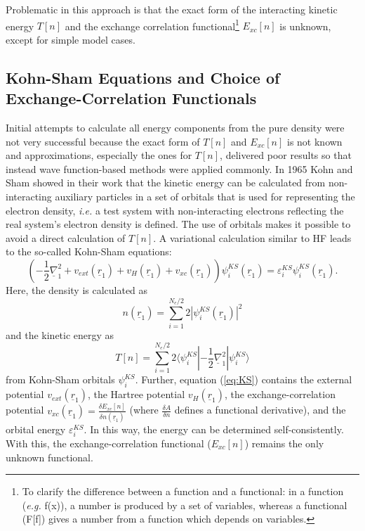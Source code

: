 \documentclass[11pt,DIV=13,BCOR=5mm,a4paper,headinclude]{scrbook}
\renewcommand{\vec}[1]{\underline{#1}}
\begin{document}
Problematic in this approach is that the exact form of the interacting kinetic energy $T[n]$ and the exchange correlation functional\footnote{To clarify the difference between a function and a functional: in a function (\textit{e.g.} f(x)), a number is produced by a set of variables, whereas a functional (F[f]) gives a number from a function which depends on variables.} $E_{xc}[n]$ is unknown, except for simple model cases.

\subsection{Kohn-Sham Equations and Choice of Exchange-Correlation Functionals}
Initial attempts to calculate all energy components from the pure density were not very successful because the exact form of $T[n]$ and $E_{xc}[n]$ is not known and approximations, especially the ones for $T[n]$, delivered poor results so that instead wave function-based methods were applied commonly.
In 1965 Kohn and Sham showed in their work\cite{Kohn-Sham1965} that the kinetic energy can be calculated from non-interacting auxiliary particles in a set of orbitals that is used for representing the electron density, \textit{i.e.} a test system with non-interacting electrons reflecting the real system's electron density is defined.
The use of orbitals makes it possible to avoid a direct calculation of $T[n]$\cite{Gross03}. %
A variational calculation similar to HF leads to the so-called Kohn-Sham equations:
\begin{equation}\label{eq:KS}
 \left(-\frac{1}{2}\vec{\nabla}^2_1 + v_{ext}(\vec{r}_1) + v_{H}(\vec{r}_1) + v_{xc}(\vec{r}_1) \right)\psi^{KS}_i(\vec{r}_1) = \varepsilon_i^{KS}\psi^{KS}_i(\vec{r}_1).
\end{equation}
Here, the density is calculated as
\begin{equation}
n(\vec{r}_1)=\sum_{i=1}^{N_e/2}2|\psi_i^{KS}(\vec{r}_1)|^2
\end{equation}
 and the kinetic energy as
 \begin{equation}
 T[n]=\sum_{i=1}^{N_e/2}2\langle\psi_i^{KS}|-\frac{1}{2}\vec{\nabla}_1^2|\psi_i^{KS}\rangle
 \end{equation}
 from Kohn-Sham orbitals $\psi_i^{KS}$.
Further, equation (\ref{eq:KS}) contains the external potential $v_{ext}(\vec{r}_1)$, the Hartree potential $v_{H}(\vec{r}_1)$, the exchange-correlation potential $v_{xc}(\vec{r}_1)=\frac{\delta E_{xc}[n]}{\delta n(\vec{r}_1)}$ (where $\frac{\delta A}{\delta n}$ defines a functional derivative), and the orbital energy $\varepsilon_i^{KS}$.
In this way, the energy can be determined self-consistently.
With this, the exchange-correlation functional ($E_{xc}[n]$) remains the only unknown functional.
\end{document}
